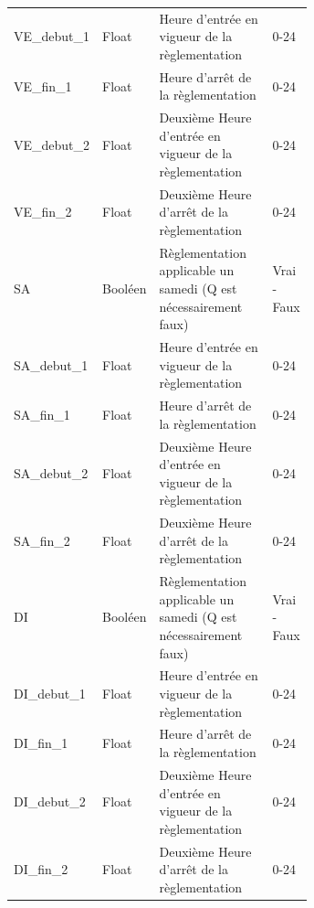 \begin{longtable}{p{0.15 \linewidth}  l p{0.5\linewidth} l  }
    VE\_debut\_1 & Float & Heure d'entrée en vigueur de la règlementation & 0-24\\
    VE\_fin\_1 & Float & Heure d'arrêt de la règlementation & 0-24\\
    VE\_debut\_2 & Float & Deuxième Heure d'entrée en vigueur de la règlementation & 0-24\\
    VE\_fin\_2 & Float & Deuxième Heure d'arrêt de la règlementation & 0-24 \\
    SA & Booléen & Règlementation applicable un samedi (Q est nécessairement faux) & Vrai - Faux \\
    SA\_debut\_1 & Float & Heure d'entrée en vigueur de la règlementation & 0-24\\
    SA\_fin\_1 & Float & Heure d'arrêt de la règlementation & 0-24\\
    SA\_debut\_2 & Float & Deuxième Heure d'entrée en vigueur de la règlementation & 0-24\\
    SA\_fin\_2 & Float & Deuxième Heure d'arrêt de la règlementation & 0-24 \\
    DI & Booléen & Règlementation applicable un samedi (Q est nécessairement faux) & Vrai - Faux \\
    DI\_debut\_1 & Float & Heure d'entrée en vigueur de la règlementation & 0-24\\
    DI\_fin\_1 & Float & Heure d'arrêt de la règlementation & 0-24\\
    DI\_debut\_2 & Float & Deuxième Heure d'entrée en vigueur de la règlementation & 0-24\\
    DI\_fin\_2 & Float & Deuxième Heure d'arrêt de la règlementation & 0-24 \\  
  \end{longtable}

  \FloatBarrier

